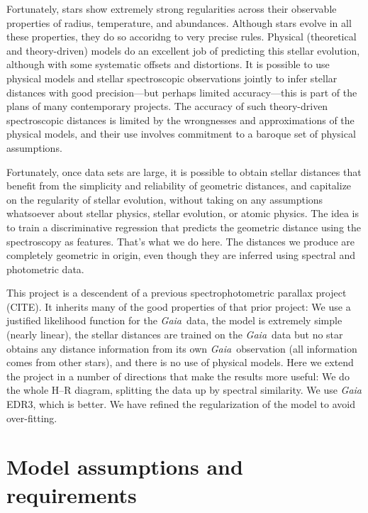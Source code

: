 \documentclass[modern]{aastex631}
\newcommand{\acronym}[1]{{\small{#1}}}
\newcommand{\project}[1]{\textsl{#1}}
\newcommand{\Gaia}{\project{Gaia}}
\begin{document}
Fortunately, stars show extremely strong regularities across their observable
properties of radius, temperature, and abundances.
Although stars evolve in all these properties, they do so accoridng to very
precise rules.
Physical (theoretical and theory-driven) models do an excellent job of predicting
this stellar evolution, although with some systematic offsets and distortions.
It is possible to use physical models and stellar spectroscopic observations
jointly to infer stellar distances with good precision---but perhaps limited
accuracy---this is part of the plans of many contemporary projects.
The accuracy of such theory-driven spectroscopic distances is limited by the
wrongnesses and approximations of the physical models, and their use involves
commitment to a baroque set of physical assumptions.

Fortunately, once data sets are large, it is possible to obtain stellar distances
that benefit from the simplicity and reliability of geometric distances, and
capitalize on the regularity of stellar evolution, without taking on any assumptions
whatsoever about stellar physics, stellar evolution, or atomic physics.
The idea is to train a discriminative regression that predicts the geometric
distance using the spectroscopy as features.
That's what we do here.
The distances we produce are completely geometric in origin, even though they
are inferred using spectral and photometric data.

This project is a descendent of a previous spectrophotometric parallax project
(CITE).
It inherits many of the good properties of that prior project:
We use a justified likelihood function for the \Gaia\ data,
the model is extremely simple (nearly linear),
the stellar distances are trained on the \Gaia\ data but no star obtains
any distance information from its own \Gaia\ observation (all information
comes from other stars),
and there is no use of physical models.
Here we extend the project in a number of directions that make the results
more useful:
We do the whole H--R diagram, splitting the data up by spectral similarity.
We use \Gaia{} \acronym{EDR3}, which is better.
We have refined the regularization of the model to avoid over-fitting.

\section{Model assumptions and requirements}
\end{document}
